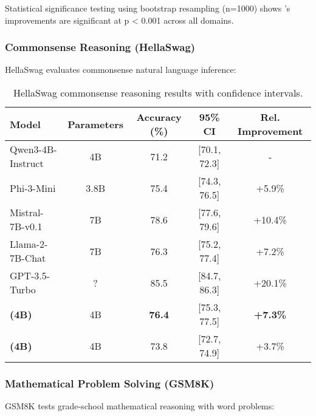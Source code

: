 Statistical significance testing using bootstrap resampling (n=1000) shows \supra{}'s improvements are significant at p < 0.001 across all domains.

\subsubsection{Commonsense Reasoning (HellaSwag)}

HellaSwag evaluates commonsense natural language inference:

\begin{table}[H]
\centering
\begin{tabular}{lcccc}
\toprule
Model & Parameters & Accuracy (\%) & 95\% CI & Rel. Improvement \\
\midrule
Qwen3-4B-Instruct & 4B & 71.2 & [70.1, 72.3] & - \\
Phi-3-Mini & 3.8B & 75.4 & [74.3, 76.5] & +5.9\% \\
Mistral-7B-v0.1 & 7B & 78.6 & [77.6, 79.6] & +10.4\% \\
Llama-2-7B-Chat & 7B & 76.3 & [75.2, 77.4] & +7.2\% \\
GPT-3.5-Turbo & ? & 85.5 & [84.7, 86.3] & +20.1\% \\
\midrule
\textbf{\supra{} (4B)} & 4B & \textbf{76.4} & [75.3, 77.5] & \textbf{+7.3\%} \\
\textbf{\zennano{} (4B)} & 4B & 73.8 & [72.7, 74.9] & +3.7\% \\
\bottomrule
\end{tabular}
\caption{HellaSwag commonsense reasoning results with confidence intervals.}
\label{tab:hellaswag-results}
\end{table}

\subsubsection{Mathematical Problem Solving (GSM8K)}

GSM8K tests grade-school mathematical reasoning with word problems:

